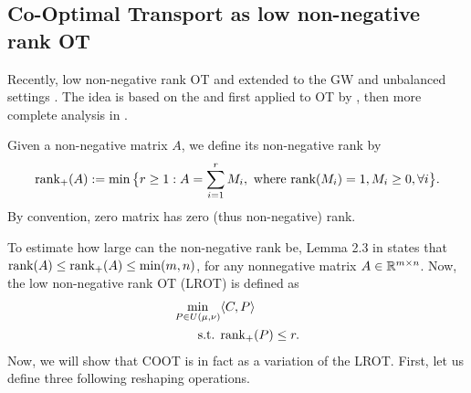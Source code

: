 \subsection{Co-Optimal Transport as low non-negative rank OT}

Recently, low non-negative rank OT \citep{Meyer21a} and extended to the GW and unbalanced settings
\citep{Meyer21b,Meyer23}. The idea is based on the \citep{Joel93} and first applied to OT by
\citep{Forrow18}, then more complete analysis in \citep{Meyer22}.
\begin{definition}
  Given a non-negative matrix $A$, we define its non-negative rank by
  \begin{equation*}
    \text{rank}_{+}(A):= \min \big\{ r \geq 1: A = \sum_{i=1}^r M_i,
    \text{ where } \text{rank}(M_i) = 1, M_i \geq 0, \forall i \big\}.
  \end{equation*}
  By convention, zero matrix has zero (thus non-negative) rank.
\end{definition}
To estimate how large can the non-negative rank be, Lemma 2.3 in \citep{Joel93} states that
$\text{rank}(A) \leq \text{rank}_+(A) \leq \min(m, n)$, for any nonnegative matrix $A \in \mathbb R^{m \times n}$.
Now, the low non-negative rank OT (LROT) is defined as
\begin{align*}
  \min_{P \in U(\mu, \nu)} &\langle C, P \rangle \\
  \text{ s.t. } &\text{rank}_+(P) \leq r.
\end{align*}
Now, we will show that COOT is in fact as a variation of the LROT.
First, let us define three following reshaping operations.
